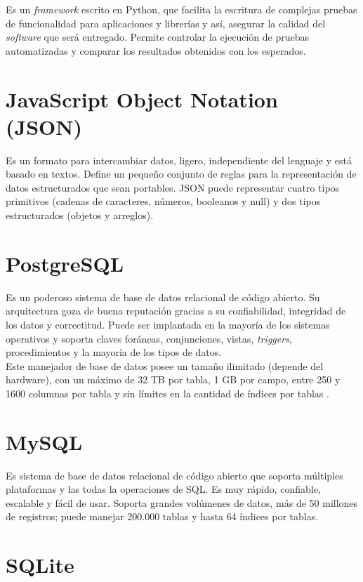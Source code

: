 Es un \textit{framework} escrito en Python, que facilita la escritura de complejas pruebas de funcionalidad para aplicaciones y librerías y así, asegurar la calidad del \textit{software} que será entregado. Permite controlar la ejecución de pruebas automatizadas y comparar los resultados obtenidos con los esperados. \cite{pytest}

\section{JavaScript Object Notation (JSON)}

Es un formato para intercambiar datos, ligero, independiente del lenguaje y está basado en textos. Define un pequeño conjunto de reglas para la representación de datos estructurados que sean portables. JSON puede representar cuatro tipos primitivos (cadenas de caracteres, números, booleanos y null) y dos tipos estructurados (objetos y arreglos). \cite{JSON}

\section{PostgreSQL}

Es un poderoso sistema de base de datos relacional de código abierto. Su arquitectura goza de buena reputación gracias a su confiabilidad, integridad de los datos y correctitud. Puede ser implantada en la mayoría de los sistemas operativos y soporta claves foráneas, conjunciones, vistas, \textit{triggers}, procedimientos y la mayoría de los tipos de datos. \\

Este manejador de base de datos posee un tamaño ilimitado (depende del
hardware), con un máximo de 32 TB por tabla, 1 GB por campo, entre 250 y 1600
columnas por tabla y sin límites en la cantidad de índices por tablas
\cite{PostgreSQL}.

\section{MySQL}

Es sistema de base de datos relacional de código abierto que soporta múltiples plataformas y las todas la operaciones de SQL. Es muy rápido, confiable, escalable y fácil de usar. Soporta grandes volúmenes de datos, más de 50 millones de registros; puede manejar 200.000 tablas y hasta 64 índices por tablas. \cite{MySQL}

\section{SQLite}

